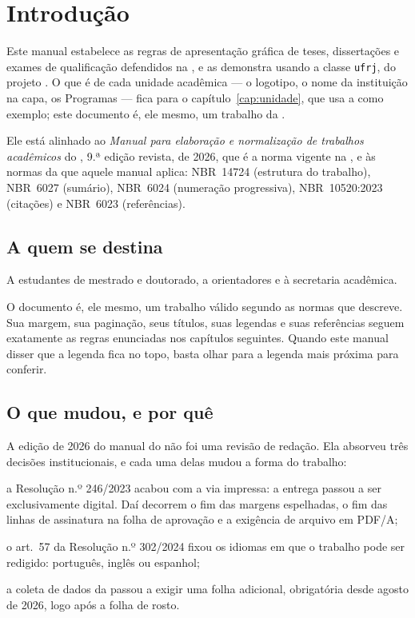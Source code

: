 \documentclass[dsc]{ufrj}
\begin{document}
  \mainmatter

  \chapter{Introdução}

  Este manual estabelece as regras de apresentação gráfica de teses,
  dissertações e exames de qualificação defendidos na , e as
  demonstra usando a classe \texttt{ufrj}, do projeto \CoppeTeX. O que é de
  cada unidade acadêmica ---
  o logotipo, o nome da instituição na capa, os Programas --- fica para o
  capítulo~\ref{cap:unidade}, que usa a  como exemplo; este
  documento é, ele mesmo, um trabalho da .

  Ele está alinhado ao \emph{Manual para elaboração e normalização de trabalhos
  acadêmicos} do , 9.ª edição revista, de 2026, que é a norma
  vigente na , e às normas da  que aquele manual aplica:
  \mbox{NBR~14724} (estrutura do trabalho), \mbox{NBR~6027} (sumário),
  \mbox{NBR~6024} (numeração progressiva), \mbox{NBR~10520:2023} (citações) e
  \mbox{NBR~6023} (referências).

  \section{A quem se destina}

  A estudantes de mestrado e doutorado, a orientadores e à secretaria acadêmica.

  O documento é, ele mesmo, um trabalho válido segundo as normas que descreve.
  Sua margem, sua paginação, seus títulos, suas legendas e suas referências
  seguem exatamente as regras enunciadas nos capítulos seguintes. Quando este
  manual disser que a legenda fica no topo, basta olhar para a legenda mais
  próxima para conferir.

  \section{O que mudou, e por quê}

  A edição de 2026 do manual do  não foi uma revisão de redação.
  Ela absorveu três decisões institucionais, e cada uma delas mudou a forma do
  trabalho:

  \begin{alineas}
    \item a Resolução  n.º 246/2023 acabou com a via impressa: a
      entrega passou a ser exclusivamente digital. Daí decorrem o fim das
      margens espelhadas, o fim das linhas de assinatura na folha de aprovação e
      a exigência de arquivo em PDF/A;
    \item o art.\ 57 da Resolução  n.º 302/2024 fixou os idiomas em
      que o trabalho pode ser redigido: português, inglês ou espanhol;
    \item a coleta de dados da  passou a exigir uma folha adicional,
      obrigatória desde agosto de 2026, logo após a folha de rosto.
  \end{alineas}
\end{document}

